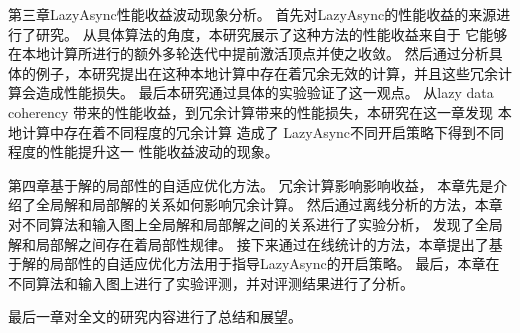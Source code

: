 第三章LazyAsync性能收益波动现象分析。
首先对LazyAsync的性能收益的来源进行了研究。
从具体算法的角度，本研究展示了这种方法的性能收益来自于 它能够在本地计算所进行的额外多轮迭代中提前激活顶点并使之收敛。
然后通过分析具体的例子，本研究提出在这种本地计算中存在着冗余无效的计算，并且这些冗余计算会造成性能损失。
最后本研究通过具体的实验验证了这一观点。
从lazy data coherency 带来的性能收益，到冗余计算带来的性能损失，本研究在这一章发现
本地计算中存在着不同程度的冗余计算
造成了
LazyAsync不同开启策略下得到不同程度的性能提升这一
性能收益波动的现象。

第四章基于解的局部性的自适应优化方法。
冗余计算影响影响收益，
本章先是介绍了全局解和局部解的关系如何影响冗余计算。
然后通过离线分析的方法，本章对不同算法和输入图上全局解和局部解之间的关系进行了实验分析，
发现了全局解和局部解之间存在着局部性规律。
接下来通过在线统计的方法，本章提出了基于解的局部性的自适应优化方法用于指导LazyAsync的开启策略。
最后，本章在不同算法和输入图上进行了实验评测，并对评测结果进行了分析。

最后一章对全文的研究内容进行了总结和展望。




